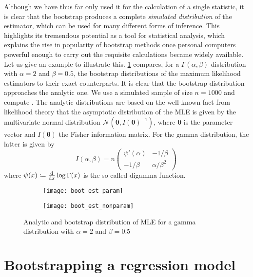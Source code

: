 \documentclass[a4paper]{book}
\begin{document}
Although we have thus far only used it for the calculation of a single statistic, it is clear that the bootstrap produces a complete \emph{simulated distribution} of the estimator, which can be used for many different forms of inference. This highlights its tremendous potential as a tool for statistical analysis, which explains the rise in popularity of bootstrap methods once personal computers powerful enough to carry out the requisite calculations became widely available. Let us give an example to illustrate this. \cref{fig:boot-est} compares, for a $\Gamma(\alpha, \beta)$-distribution with $\alpha = 2$ and $\beta = 0.5$, the bootstrap distributions of the maximum likelihood estimators to their exact counterparts. It is clear that the bootstrap distribution approaches the analytic one. We use a simulated sample of size $n = 1000$ and compute . The analytic distributions are based on the well-known fact from likelihood theory that the asymptotic distribution of the MLE is given by the multivariate normal distribution $\mathcal{N}(\bm{\theta}, I(\bm{\theta})^{-1})$, where $\bm{\theta}$ is the parameter vector and $I(\bm{\theta})$ the Fisher information matrix. For the gamma distribution, the latter is given by
\begin{equation}
  I(\alpha, \beta) = n
  \begin{pmatrix}
    \psi'(\alpha) & -1 / \beta       \\
    -1 / \beta    & \alpha / \beta^2
  \end{pmatrix} \,
\end{equation}
where $\psi(x) \coloneqq \odv{}{x} \log \Gamma(x)$ is the so-called digamma function.

\begin{landscape}
  \begin{figure}
    \begin{subfigure}{\linewidth}
      \texttt{[image: boot\_est\_param]}
    \end{subfigure}
    \begin{subfigure}{\linewidth}
      \texttt{[image: boot\_est\_nonparam]}
    \end{subfigure}
    \caption{Analytic and bootstrap distribution of MLE for a gamma distribution with $\alpha = 2$ and $\beta = 0.5$}
    \label{fig:boot-est}
  \end{figure}
\end{landscape}

\section{Bootstrapping a regression model} \label{sec:boot-reg}
\end{document}
